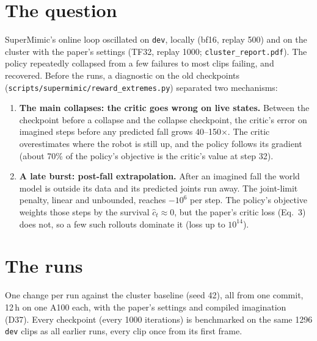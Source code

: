 \documentclass[10pt]{article}
\begin{document}
\section{The question}

SuperMimic's online loop oscillated on \texttt{dev}, locally (bf16, replay 500) and on the cluster with
the paper's settings (TF32, replay 1000; \texttt{cluster\_report.pdf}). The policy repeatedly collapsed
from a few failures to most clips failing, and recovered. Before the runs, a diagnostic on the old
checkpoints (\texttt{scripts/supermimic/reward\_extremes.py}) separated two mechanisms:
\begin{enumerate}
  \item \textbf{The main collapses: the critic goes wrong on live states.} Between the checkpoint before
  a collapse and the collapse checkpoint, the critic's error on imagined steps before any predicted fall
  grows 40--150$\times$. The critic overestimates where the robot is still up, and the policy follows its
  gradient (about 70\% of the policy's objective is the critic's value at step 32).
  \item \textbf{A late burst: post-fall extrapolation.} After an imagined fall the world model is
  outside its data and its predicted joints run away. The joint-limit penalty, linear and unbounded,
  reaches $-10^6$ per step. The policy's objective weights those steps by the survival $\hat c_t\approx0$,
  but the paper's critic loss (Eq.~3) does not, so a few such rollouts dominate it (loss up to
  $10^{14}$).
\end{enumerate}

\section{The runs}

One change per run against the cluster baseline (seed 42), all from one commit, 12\,h on one A100 each,
with the paper's settings and compiled imagination (D37). Every checkpoint (every 1000 iterations) is
benchmarked on the same 1296 \texttt{dev} clips as all earlier runs, every clip once from its first
frame.
\end{document}
